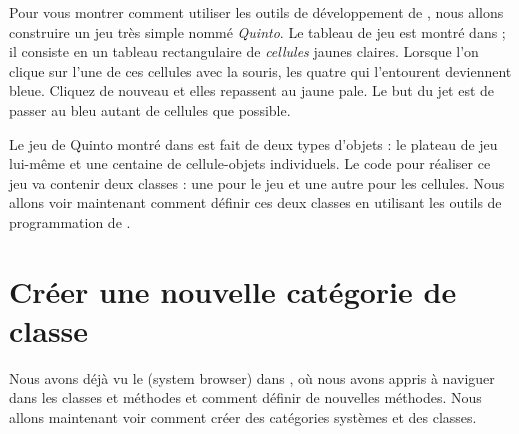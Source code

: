 \documentclass[a4paper,10pt,twoside]{book}
\begin{document}
Pour vous montrer comment utiliser les outils de d\'eveloppement de \squeak, nous allons construire un jeu tr\`es simple nomm\'e \emph{Quinto}.  Le tableau de jeu est montr\'e dans ; il consiste en un tableau rectangulaire de \emph{cellules} jaunes claires.  Lorsque l'on clique sur l'une de ces cellules avec la souris, les quatre qui l'entourent deviennent bleue. Cliquez de nouveau et elles repassent au jaune pale. Le but du jet est de passer au bleu autant de cellules que possible.

Le jeu de Quinto montr\'e dans  est fait de deux types d'objets : le plateau de jeu lui-même et une centaine de cellule-objets individuels. Le code \squeak pour r\'ealiser ce jeu va contenir deux classes : une pour le jeu et une autre pour les cellules.
Nous allons voir maintenant comment d\'efinir ces deux classes en utilisant les outils de programmation de \squeak.

\section{Créer une nouvelle catégorie de classe}

Nous avons déjà vu le  (system browser) dans , où nous avons appris à naviguer dans les classes et m\'ethodes et comment d\'efinir de nouvelles m\'ethodes.
Nous allons maintenant voir comment cr\'eer des cat\'egories syst\`emes et des classes.

\end{document}
